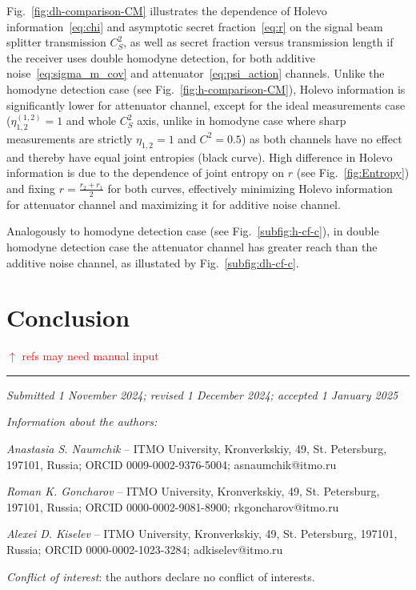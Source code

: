 \documentclass{nsart_eng3}
\begin{document}
Fig.~\ref{fig:dh-comparison-CM} illustrates the dependence of Holevo information~\eqref{eq:chi} and asymptotic secret fraction~\eqref{eq:r} on the signal beam splitter transmission $C_S^2$, as well as secret fraction versus transmission length if the receiver uses double homodyne detection, for both additive noise~\eqref{eq:sigma_m_cov} and attenuator~\eqref{eq:psi_action} channels.
Unlike the homodyne detection case (see Fig.~\ref{fig:h-comparison-CM}), Holevo information is significantly lower for attenuator channel, except for the ideal measurements case ($\eta_{1,2}^{(1,2)}=1$ and whole $C_S^2$ axis, unlike in homodyne case where sharp measurements are strictly $\eta_{1,2}=1$ and $C^2=0.5$) as both channels have no effect and thereby have equal joint entropies (black curve).
High difference in Holevo information is due to the dependence of joint entropy on $r$ (see Fig.~\ref{fig:Entropy}) and fixing $r=\frac{r_2+r_1}{2}$ for both curves, effectively minimizing Holevo information for attenuator channel and maximizing it for additive noise channel. 

Analogously to homodyne detection case (see Fig.~\ref{subfig:h-cf-c}), in double homodyne detection case the attenuator channel has greater reach than the additive noise channel, as illustated by Fig.~\ref{subfig:dh-cf-c}.

\section{Conclusion}



\textcolor{red}{$\uparrow$ refs may need manual input}

\noindent\textcolor{main-blue}{\rule{\textwidth}{1.5pt}}
\begin{flushright}
	\emph{Submitted 1 November 2024; revised 1 December 2024; accepted 1 January 2025}
\end{flushright}

{ \setlength{\parindent}{0mm} \setlength{\parskip}{3mm}
\textit{Information about the authors:}

\textit{Anastasia S. Naumchik} -- ITMO University, Kronverkskiy, 49, St. Petersburg, 197101, Russia; ORCID 0009-0002-9376-5004; asnaumchik@itmo.ru

\textit{Roman K. Goncharov} -- ITMO University, Kronverkskiy, 49, St. Petersburg, 197101, Russia; ORCID 0000-0002-9081-8900; rkgoncharov@itmo.ru

\textit{Alexei D. Kiselev} -- ITMO University, Kronverkskiy, 49, St. Petersburg, 197101, Russia; ORCID 0000-0002-1023-3284; adkiselev@itmo.ru

\textit{Conflict of interest}: the authors declare no conflict of interests.
}
\end{document}
